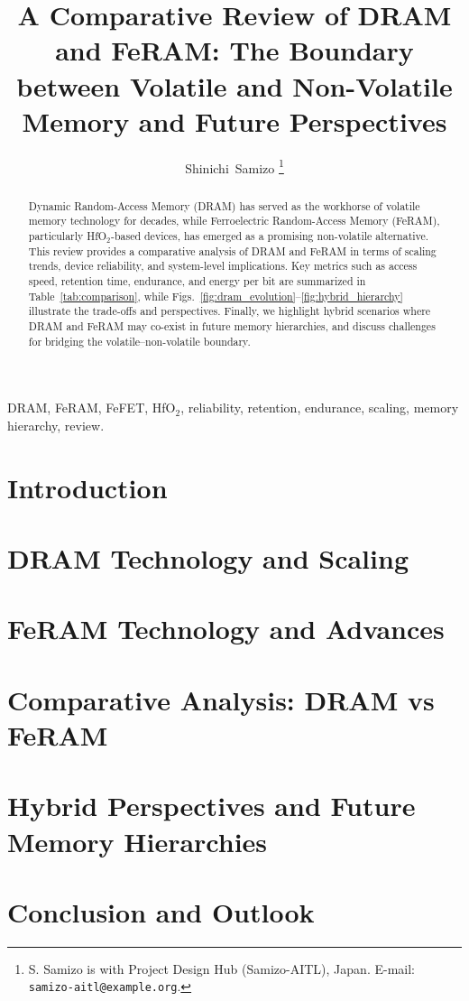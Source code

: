 \documentclass[journal]{IEEEtran}
\title{A Comparative Review of DRAM and FeRAM: The Boundary between Volatile and Non-Volatile Memory and Future Perspectives}
\author{Shinichi~Samizo%
\thanks{S. Samizo is with Project Design Hub (Samizo-AITL), Japan. E-mail: \texttt{samizo-aitl@example.org}.}
}
\begin{document}
\maketitle

\begin{abstract}
Dynamic Random-Access Memory (DRAM) has served as the workhorse of volatile memory technology for decades, while Ferroelectric Random-Access Memory (FeRAM), particularly HfO$_2$-based devices, has emerged as a promising non-volatile alternative. This review provides a comparative analysis of DRAM and FeRAM in terms of scaling trends, device reliability, and system-level implications. Key metrics such as access speed, retention time, endurance, and energy per bit are summarized in Table~\ref{tab:comparison}, while Figs.~\ref{fig:dram_evolution}--\ref{fig:hybrid_hierarchy} illustrate the trade-offs and perspectives. Finally, we highlight hybrid scenarios where DRAM and FeRAM may co-exist in future memory hierarchies, and discuss challenges for bridging the volatile--non-volatile boundary.
\end{abstract}

\begin{IEEEkeywords}
DRAM, FeRAM, FeFET, HfO$_2$, reliability, retention, endurance, scaling, memory hierarchy, review.
\end{IEEEkeywords}

\section{Introduction}


\section{DRAM Technology and Scaling}


\section{FeRAM Technology and Advances}


\section{Comparative Analysis: DRAM vs FeRAM}
\label{sec:comparison}


\section{Hybrid Perspectives and Future Memory Hierarchies}


\section{Conclusion and Outlook}


\nocite{*}


\end{document}
